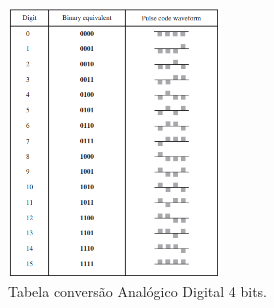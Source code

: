 


\begin{figure}[ht]
    \centering
    \caption{Tabela conversão Analógico Digital 4 bits.}
    \begin{center}
        \includegraphics[width=0.5\textwidth]{img/print_Conversao_AD2.png}
    \end{center}
    \vspace{-0.5cm}
    

    
    \label{fig:AD2}
\end{figure}
